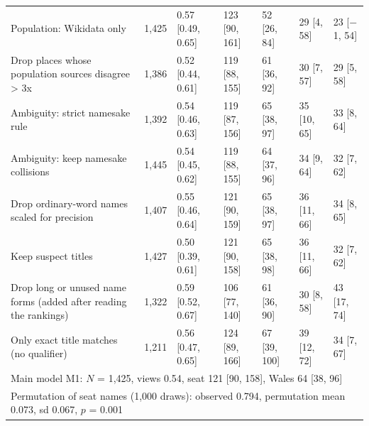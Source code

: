 \documentclass[11pt,a4paper]{article}
\begin{document}
\begin{table}[tbp]
\begin{tabular}{p{5.3cm}rlllll}
\quad Population: Wikidata only & 1,425 & 0.57 [0.49, 0.65] & 123 [90, 161] & 52 [26, 84] & 29 [4, 58] & 23 [$-$1, 54]\\
\quad Drop places whose population sources disagree > 3x & 1,386 & 0.52 [0.44, 0.61] & 119 [88, 155] & 61 [36, 92] & 30 [7, 57] & 29 [5, 58]\\
\quad Ambiguity: strict namesake rule & 1,392 & 0.54 [0.46, 0.63] & 119 [87, 156] & 65 [38, 97] & 35 [10, 65] & 33 [8, 64]\\
\quad Ambiguity: keep namesake collisions & 1,445 & 0.54 [0.45, 0.62] & 119 [88, 155] & 64 [37, 96] & 34 [9, 64] & 32 [7, 62]\\
\quad Drop ordinary-word names scaled for precision & 1,407 & 0.55 [0.46, 0.64] & 121 [90, 159] & 65 [38, 97] & 36 [11, 66] & 34 [8, 65]\\
\quad Keep suspect titles & 1,427 & 0.50 [0.39, 0.61] & 121 [90, 158] & 65 [38, 98] & 36 [11, 66] & 32 [7, 62]\\
\quad Drop long or unused name forms (added after reading the rankings) & 1,322 & 0.59 [0.52, 0.67] & 106 [77, 140] & 61 [36, 90] & 30 [8, 58] & 43 [17, 74]\\
\quad Only exact title matches (no qualifier) & 1,211 & 0.56 [0.47, 0.65] & 124 [89, 166] & 67 [39, 100] & 39 [12, 72] & 34 [7, 67]\\
\midrule\multicolumn{7}{l}{Main model M1: $N$ = 1,425, views 0.54, seat 121 [90, 158], Wales 64 [38, 96]}\\
\multicolumn{7}{l}{Permutation of seat names (1,000 draws): observed 0.794, permutation mean 0.073, sd 0.067, $p$ = 0.001}\\
\bottomrule\end{tabular}\end{table}
\end{document}
